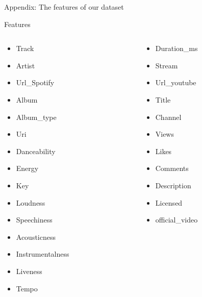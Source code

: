 \documentclass[8pt]{beamer}
\begin{document}
\appendix
\begin{frame}{Appendix: The features of our dataset}
  \begin{alertblock}{Features}
    \begin{columns}[t]
      \begin{column}{0.5\textwidth}
        \begin{itemize}
          \item Track
          \item Artist
          \item Url\_Spotify 
          \item Album 
          \item Album\_type 
          \item Uri 
          \item Danceability
          \item Energy 
          \item Key 
          \item Loudness 
          \item Speechiness 
          \item Acousticness 
          \item Instrumentalness
          \item Liveness 
          \item Tempo 
        \end{itemize}
      \end{column}
      \begin{column}{0.5\textwidth}
        \begin{itemize}
          \item Duration\_ms 
          \item Stream 
          \item Url\_youtube 
          \item Title 
          \item Channel
          \item Views 
          \item Likes 
          \item Comments 
          \item Description 
          \item Licensed
          \item official\_video
        \end{itemize}
      \end{column}
    \end{columns}
  \end{alertblock}
\end{frame}






\end{document}
